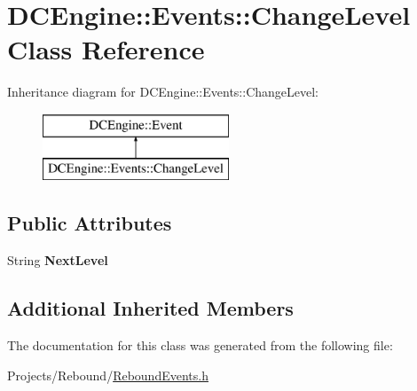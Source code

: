 \hypertarget{classDCEngine_1_1Events_1_1ChangeLevel}{\section{D\-C\-Engine\-:\-:Events\-:\-:Change\-Level Class Reference}
\label{classDCEngine_1_1Events_1_1ChangeLevel}
}
Inheritance diagram for D\-C\-Engine\-:\-:Events\-:\-:Change\-Level\-:\begin{figure}[H]
\begin{center}
\leavevmode
\includegraphics[height=2.000000cm]{classDCEngine_1_1Events_1_1ChangeLevel}
\end{center}
\end{figure}
\subsection*{Public Attributes}
\begin{DoxyCompactItemize}
\item 
\hypertarget{classDCEngine_1_1Events_1_1ChangeLevel_a074a7f37f4b51ecbf97e6c3bfdbdfc0b}{String {\bfseries Next\-Level}}\label{classDCEngine_1_1Events_1_1ChangeLevel_a074a7f37f4b51ecbf97e6c3bfdbdfc0b}

\end{DoxyCompactItemize}
\subsection*{Additional Inherited Members}


The documentation for this class was generated from the following file\-:\begin{DoxyCompactItemize}
\item 
Projects/\-Rebound/\hyperlink{ReboundEvents_8h}{Rebound\-Events.\-h}\end{DoxyCompactItemize}
